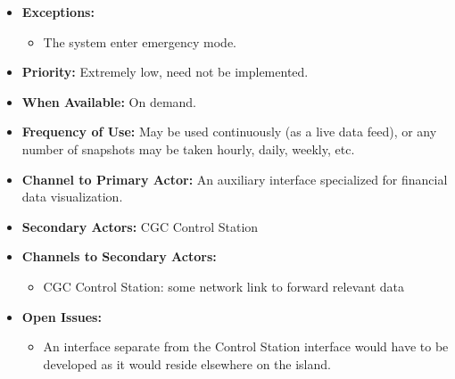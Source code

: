 \documentclass[12pt]{article}
\begin{document}
\begin{itemize}
        \item[]\textbf{Exceptions:}
            \begin{itemize}
                \item[] The system enter emergency mode.
            \end{itemize}

        \item[]\textbf{Priority:}
            Extremely low, need not be implemented.

        \item[]\textbf{When Available:}
            On demand.

        \item[]\textbf{Frequency of Use:}
            May be used continuously (as a live data feed), or any number of snapshots
            may be taken hourly, daily, weekly, etc.

        \item[]\textbf{Channel to Primary Actor:}
            An auxiliary interface specialized for financial data visualization.

        \item[]\textbf{Secondary Actors:}
            CGC Control Station
            
        \item[]\textbf{Channels to Secondary Actors:}
            \begin{itemize}
                \item[] CGC Control Station: some network link to forward relevant data
            \end{itemize}

        \item[]\textbf{Open Issues:}
            \begin{itemize}
                \item[] An interface separate from the Control Station interface would have to
                be developed as it would reside elsewhere on the island.
            \end{itemize}
    \end{itemize}
    
    
    

\end{document}
